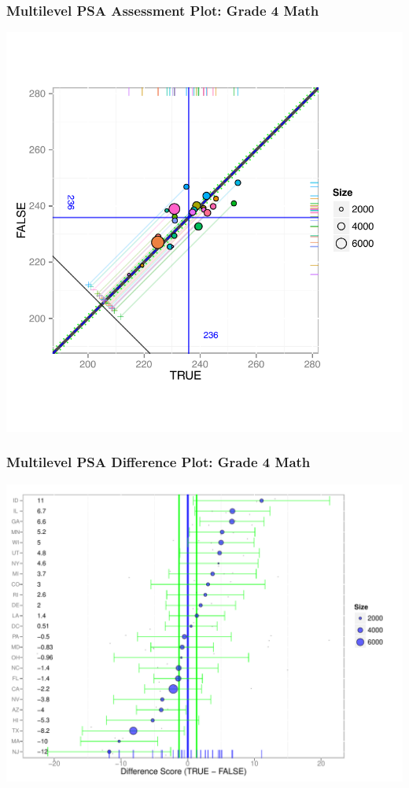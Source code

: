 \documentclass[10pt,handout,mathserif]{beamer}
\begin{document}
\begin{frame}[c]
	\frametitle{Multilevel PSA Assessment Plot: Grade 4 Math}
	\begin{center}
	\includegraphics[height=\paperheight,keepaspectratio]{../Figures2009/g4math-mlpsa-ctree-circ}
	\end{center}
\end{frame}

\begin{frame}[c]
	\frametitle{Multilevel PSA Difference Plot: Grade 4 Math}
	\begin{center}
	\includegraphics[height=\textheight,keepaspectratio]{../Figures2009/g4math-mlpsa-ctree-diff}
	\end{center}
\end{frame}
\end{document}
